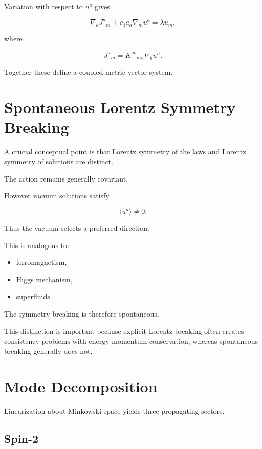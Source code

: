 \documentclass[11pt,a4paper]{article}
\begin{document}
Variation with respect to $u^a$ gives

\begin{equation}
\nabla_a J^a{}_m
+
c_4 a_a\nabla_m u^a
=
\lambda u_m ,
\end{equation}

where

\begin{equation}
J^a{}_m
=
K^{ab}{}_{mn}
\nabla_b u^n.
\end{equation}

Together these define a coupled metric-vector system.

\section{Spontaneous Lorentz Symmetry Breaking}

A crucial conceptual point is that Lorentz symmetry of the laws
and Lorentz symmetry of solutions are distinct.

The action remains generally covariant.

However vacuum solutions satisfy

\begin{equation}
\langle u^a\rangle \neq 0.
\end{equation}

Thus the vacuum selects a preferred direction.

This is analogous to:

\begin{itemize}
\item ferromagnetism,
\item Higgs mechanism,
\item superfluids.
\end{itemize}

The symmetry breaking is therefore spontaneous.

This distinction is important because explicit Lorentz breaking often
creates consistency problems with energy-momentum conservation,
whereas spontaneous breaking generally does not.

\section{Mode Decomposition}

Linearization about Minkowski space yields three propagating sectors.

\subsection{Spin-2}
\end{document}

